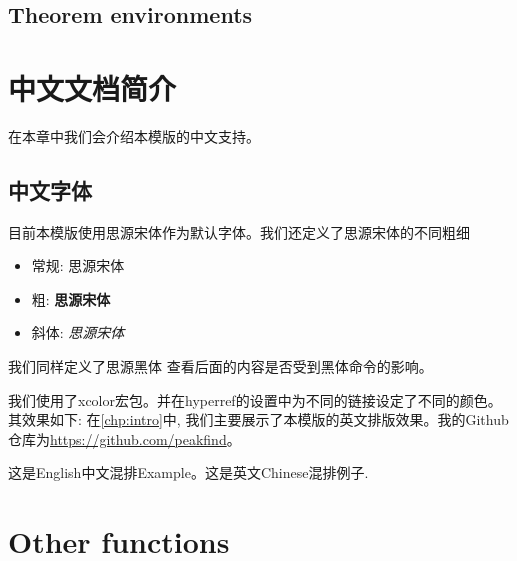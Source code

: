 \documentclass{mythesis}
\begin{document}
\section{Theorem environments}

\begin{theorem}
   \lipsum[2] 
\end{theorem}

\begin{definition}
   \lipsum[2] 
\end{definition}

\begin{lemma}
    \lipsum[2]
\end{lemma}

\begin{proposition}
   \lipsum[2] 
\end{proposition}

\begin{Proof}
   \lipsum[2] 
\end{Proof}

\chapter{中文文档简介}

在本章中我们会介绍本模版的中文支持。

\section{中文字体}

目前本模版使用思源宋体作为默认字体。我们还定义了思源宋体的不同粗细
\begin{itemize}
    \item 常规: 思源宋体 
    \item 粗: \textbf{思源宋体}
    \item 斜体: \textit{思源宋体}
\end{itemize}

我们同样定义了{\heiti 思源黑体} 查看后面的内容是否受到黑体命令的影响。

我们使用了xcolor宏包。并在hyperref的设置中为不同的链接设定了不同的颜色。其效果如下:
在\autoref{chp:intro}中, 我们主要展示了本模版的英文排版效果。我的Github仓库为\url{https://github.com/peakfind}。

这是English中文混排Example。这是英文Chinese混排例子.

\chapter{Other functions}
\end{document}
